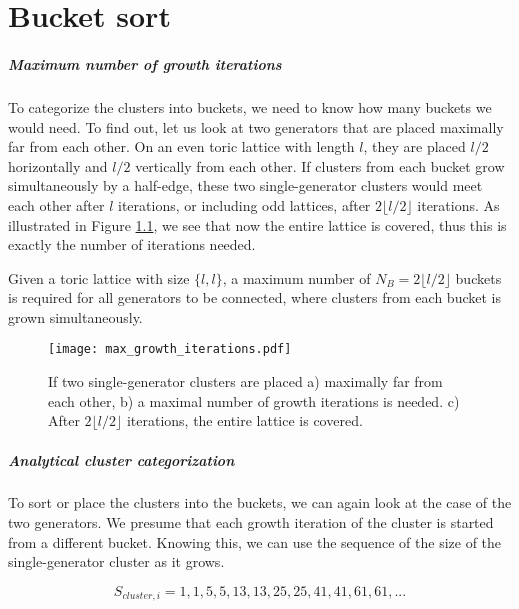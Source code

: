 \chapter{Bucket sort}\label{ap.bucketsort}

\paragraph{Maximum number of growth iterations}
To categorize the clusters into buckets, we need to know how many buckets we would need. To find out, let us look at two generators that are placed maximally far from each other. On an even toric lattice with length $l$, they are placed $l/2$ horizontally and $l/2$ vertically from each other. If clusters from each bucket grow simultaneously by a half-edge, these two single-generator clusters would meet each other after $l$ iterations, or including odd lattices, after $2\lfloor l/2 \rfloor$ iterations. As illustrated in Figure \ref{3.fig.maxgrowthit}, we see that now the entire lattice is covered, thus this is exactly the number of iterations needed.

\begin{lemma}
  Given a toric lattice with size $\{l,l\}$, a maximum number of $N_B = 2\lfloor l/2 \rfloor$ buckets is required for all generators to be connected, where clusters from each bucket is grown simultaneously.
\end{lemma}

\begin{figure}[htbp]
  \centering
  \texttt{[image: max\_growth\_iterations.pdf]}
  \caption{If two single-generator clusters are placed a) maximally far from each other, b) a maximal number of growth iterations is needed. c) After $2\lfloor l/2 \rfloor$ iterations, the entire lattice is covered.}\label{3.fig.maxgrowthit}
\end{figure}

\paragraph{Analytical cluster categorization}
To sort or place the clusters into the buckets, we can again look at the case of the two generators. We presume that each growth iteration of the cluster is started from a different bucket. Knowing this, we can use the sequence of the size of the single-generator cluster as it grows.

\begin{equation}\label{3.eq.sequence}
  S_{cluster, i} = 1, 1, 5, 5, 13, 13, 25, 25, 41, 41, 61, 61, ...
\end{equation}

